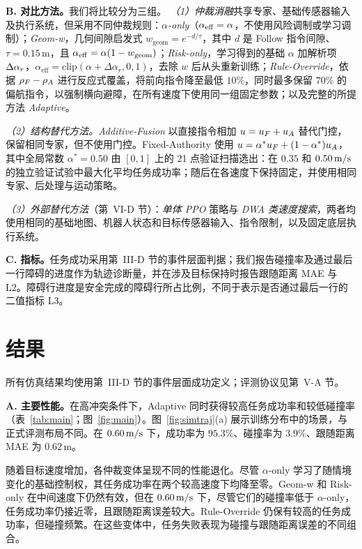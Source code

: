 \textbf{B. 对比方法。}我们将比较分为三组。
\emph{（1）仲裁消融}共享专家、基础传感器输入及执行系统，但采用不同仲裁规则：\emph{$\alpha$-only}（$\alpha_{\mathrm{eff}}=\alpha$，不使用风险调制或学习调制）；\emph{Geom-w}，几何间隙启发式 $w_{\mathrm{geom}}=e^{-d/\tau}$，其中 $d$ 是 Follow 指令间隙、$\tau=0.15\,\mathrm{m}$，且 $\alpha_{\mathrm{eff}}=\alpha(1-w_{\mathrm{geom}})$；\emph{Risk-only}，学习得到的基础 $\alpha$ 加解析项 $\Delta \alpha_r$，$\alpha_{\mathrm{eff}}=\mathrm{clip}(\alpha+\Delta\alpha_r,0,1)$，去除 $w$ 后从头重新训练；\emph{Rule-Override}，依据 $\rho_F-\rho_A$ 进行反应式覆盖，将前向指令降至最低 $10\%$，同时最多保留 $70\%$ 的偏航指令，以强制横向避障，在所有速度下使用同一组固定参数；以及完整的所提方法 \emph{Adaptive}。

\emph{（2）结构替代方法。}\emph{Additive-Fusion} 以直接指令相加 $u=u_{F}+u_{A}$ 替代门控，保留相同专家，但不使用门控。Fixed-Authority 使用 $u=\alpha^*u_{F}+(1-\alpha^*)u_{A}$，其中全局常数 $\alpha^*=0.50$ 由 $[0,1]$ 上的 21 点验证扫描选出：在 $0.35$ 和 $0.50\,\mathrm{m/s}$ 的独立验证试验中最大化平均任务成功率；随后在各速度下保持固定，并使用相同专家、后处理与运动策略。

\emph{（3）外部替代方法}（第~VI-D 节）：\emph{单体 PPO} 策略与 \emph{DWA 类速度搜索}，两者均使用相同的基础地图、机器人状态和目标传感器输入、指令限制，以及固定底层执行系统。

\textbf{C. 指标。}任务成功采用第~III-D 节的事件层面判据；我们报告碰撞率及通过最后一行障碍的进度作为轨迹诊断量，并在涉及目标保持时报告跟随距离 MAE 与 L2。障碍行进度是安全完成的障碍行所占比例，不同于表示是否通过最后一行的二值指标 L3。

\section{结果}
所有仿真结果均使用第~III-D 节的事件层面成功定义；评测协议见第~V-A 节。

\textbf{A. 主要性能。}在高冲突条件下，Adaptive 同时获得较高任务成功率和较低碰撞率（表~\ref{tab:main}；图~\ref{fig:main}）。图~\ref{fig:simtraj}(a) 展示训练分布中的场景，与正式评测布局不同。在 $0.60\,\mathrm{m/s}$ 下，成功率为 $95.3\%$、碰撞率为 $3.9\%$、跟随距离 MAE 为 $0.62\,\mathrm{m}$。

随着目标速度增加，各仲裁变体呈现不同的性能退化。尽管 $\alpha$-only 学习了随情境变化的基础控制权，其任务成功率在两个较高速度下均降至零。Geom-w 和 Risk-only 在中间速度下仍然有效，但在 $0.60\,\mathrm{m/s}$ 下，尽管它们的碰撞率低于 $\alpha$-only，任务成功率仍接近零，且跟随距离误差较大。Rule-Override 仍保有较高的任务成功率，但碰撞频繁。在这些变体中，任务失败表现为碰撞与跟随距离误差的不同组合。

